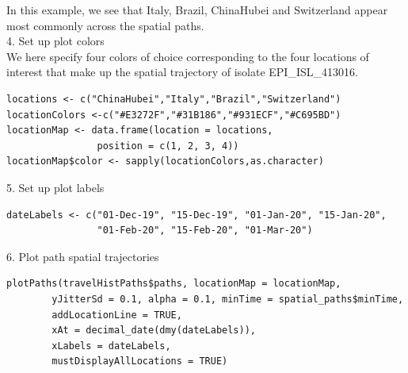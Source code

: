\documentclass{article}
\begin{document}
In this example, we see that Italy, Brazil, ChinaHubei and Switzerland appear most commonly across the spatial paths. \\

4. Set up plot colors \\

We here specify four colors of choice corresponding to the four locations of interest that make up the spatial trajectory of isolate EPI\_ISL\_413016.

\begin{verbatim}
locations <- c("ChinaHubei","Italy","Brazil","Switzerland")
locationColors <-c("#E3272F","#31B186","#931ECF","#C695BD")
locationMap <- data.frame(location = locations,
                position = c(1, 2, 3, 4))
locationMap$color <- sapply(locationColors,as.character)
\end{verbatim}

5. Set up plot labels
\begin{verbatim}
dateLabels <- c("01-Dec-19", "15-Dec-19", "01-Jan-20", "15-Jan-20",
                "01-Feb-20", "15-Feb-20", "01-Mar-20")
\end{verbatim}

6. Plot path spatial trajectories
\begin{verbatim}
plotPaths(travelHistPaths$paths, locationMap = locationMap,
        yJitterSd = 0.1, alpha = 0.1, minTime = spatial_paths$minTime,
        addLocationLine = TRUE,
        xAt = decimal_date(dmy(dateLabels)),
        xLabels = dateLabels,
        mustDisplayAllLocations = TRUE)
\end{verbatim}
\end{document}
